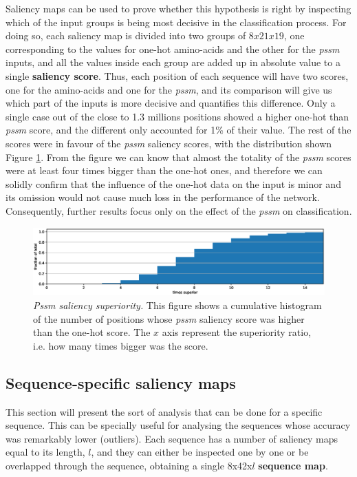 Saliency maps can be used to prove whether this hypothesis is right by inspecting which of the input groups is being most decisive in the classification process. For doing so, each saliency map is divided into two groups of $8x21x19$, one corresponding to the values for one-hot amino-acids and the other for the \textit{pssm} inputs, and all the values inside each group are added up in absolute value to a single \textbf{saliency score}. Thus, each position of each sequence will have two scores, one for the amino-acids and one for the \textit{pssm}, and its comparison will give us which part of the inputs is more decisive and quantifies this difference. Only a single case out of the close to 1.3 millions positions showed a higher one-hot than \textit{pssm} score, and the different only accounted for 1\% of their value. The rest of the scores were in favour of the \textit{pssm} saliency scores, with the distribution shown Figure \ref{fig:aa_pssm}. From the figure we can know that almost the totality of the \textit{pssm} scores were at least four times bigger than the one-hot ones, and therefore we can solidly confirm that the influence of the one-hot data on the input is minor and its omission would not cause much loss in the performance of the network. Consequently, further results focus only on the effect of the \textit{pssm} on classification.

\begin{figure}
\centering
\includegraphics[width=1\linewidth]{Figures/aa_pssm}
\caption{\textit{Pssm saliency superiority.} This figure shows a cumulative histogram of the number of positions whose \textit{pssm} saliency score was higher than the one-hot score. The $x$ axis represent the superiority ratio, i.e. how many times bigger was the score.}
\label{fig:aa_pssm}
\end{figure}


	
	\subsection{Sequence-specific saliency maps}
	This section will present the sort of analysis that can be done for a specific sequence. This can be specially useful for analysing the sequences whose accuracy was remarkably lower (outliers). Each sequence has a number of saliency maps equal to its length, $l$, and they can either be inspected one by one or be overlapped through the sequence, obtaining a single 8x42x$l$ \textbf{sequence map}.
	
